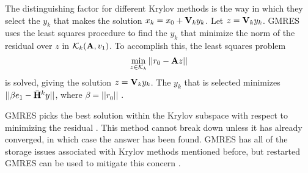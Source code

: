The distinguishing factor for different Krylov methods is the way in which they select the $y_k$ that makes the solution $x_k = x_0 + \mathbf{V}_k y_k$. Let $z = \mathbf{V}_k y_k$. GMRES uses the least squares procedure to find the $y_k$ that minimize the norm of the residual over $z$ in $\mathcal{K}_{k}(\mathbf{A}, v_1)$. To accomplish this, the least squares problem
%
\begin{equation}
  \min_{z \in \mathcal{K}_{k}} ||r_{0} - \mathbf{A}z||
  \label{eq:least-squares}
\end{equation} 
%
is solved, giving the solution $z = \mathbf{V}_{k} y_{k}$. The $y_{k}$ that is selected minimizes $||\beta e_{1} - \bar{\mathbf{H}}^{k} y||$, where $\beta = ||r_{0}||$  \cite{Saad1986}. 

GMRES picks the best solution within the Krylov subspace with respect to minimizing the residual \cite{Ipsen1998}. %
This method cannot break down unless it has already converged, in which case the answer has been found. GMRES has all of the storage issues associated with Krylov methods mentioned before, but restarted GMRES can be used to mitigate this concern \cite{Saad1986}.


